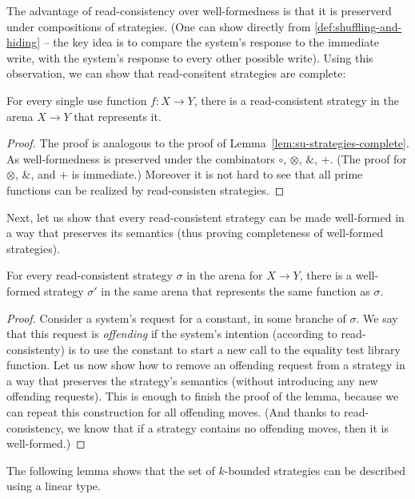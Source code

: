 The advantage of read-consistency over well-formedness is that it is preserverd under compositions of strategies. 
(One can show directly from \ref{def:shuffling-and-hiding} -- the key idea is to compare the system's response to the immediate write,
with the system's response to every other possible write). Using this observation, we can show that read-consitent strategies are complete:
\begin{lemma}
    For every single use function $f : X \to Y$, there is a read-consistent strategy in the arena $X \to Y$ that represents it. 
\end{lemma}
\begin{proof}
    The proof is analogous to the proof of Lemma~\ref{lem:su-strategies-complete}. As well-formedness is preserved
    under the combinators $\circ$, $\otimes$, $\&$, $+$. (The proof for $\otimes$, $\&$, and $+$ is immediate.)
    Moreover it is not hard to see that all prime functions can be realized by read-consisten strategies. 
\end{proof}

Next, let us show that every read-consistent strategy can be made well-formed in a way that preserves its semantics
(thus proving completeness of well-formed strategies). 
\begin{lemma}
    For every read-consistent strategy $\sigma$ in the arena for $X \to Y$,
    there is a well-formed strategy $\sigma'$ in the same arena that represents the same function as $\sigma$.
\end{lemma}
\begin{proof}
    Consider a system's request for a constant, in some branche of $\sigma$. 
    We say that this request is \emph{offending} if the system's intention (according to read-consistenty) is to use
    the constant to start a new call to the equality test library function.
    Let us now show how to remove an offending request from a strategy in a way that preserves the strategy's semantics
    (without introducing any new offending requests). This is enough to finish the proof of the lemma,
    because we can repeat this construction for all offending moves. (And thanks to read-consistency, we know that 
    if a strategy contains no offending moves, then it is well-formed.)


    
    


\end{proof}



The following lemma shows that the set of $k$-bounded strategies can be described using a linear type.

